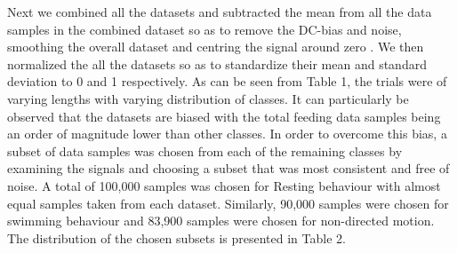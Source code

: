 \documentclass[conference]{IEEEtran}
\begin{document}
Next we combined all the datasets and subtracted the mean from all the data samples in the combined dataset so as to remove the DC-bias and noise, smoothing the overall dataset and centring the signal around zero \cite{14}. We then normalized the all the datasets so as to standardize their mean and standard deviation to 0 and 1 respectively. 
As can be seen from Table 1, the trials were of varying lengths with varying distribution of classes. It can particularly be observed that the datasets are biased with the total feeding data samples being an order of magnitude lower than other classes. In order to overcome this bias, a subset of data samples was chosen from each of the remaining classes by examining the signals and choosing a subset that was most consistent and free of noise. A total of 100,000 samples was chosen for Resting behaviour with almost equal samples taken from each dataset. Similarly, 90,000 samples were chosen for swimming behaviour and 83,900 samples were chosen for non-directed motion. The distribution of the chosen subsets is presented in Table 2.

\end{document}
